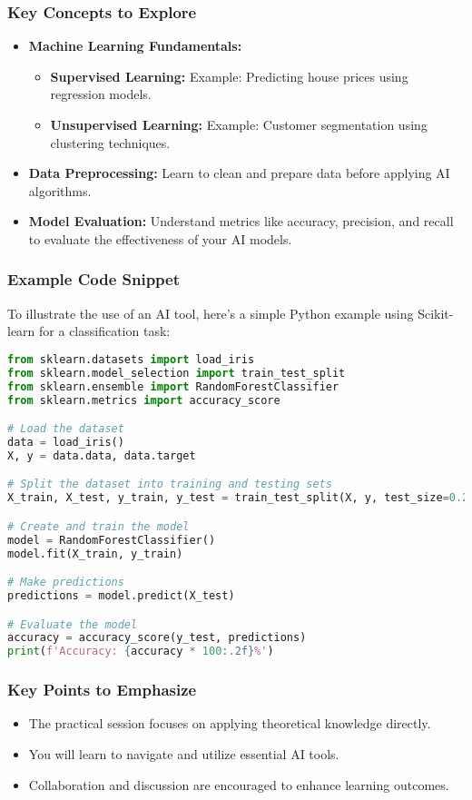 \documentclass{beamer}
\begin{document}
\begin{frame}[fragile]
    \frametitle{Key Concepts to Explore}
    \begin{itemize}
        \item \textbf{Machine Learning Fundamentals:}
            \begin{itemize}
                \item \textbf{Supervised Learning:} Example: Predicting house prices using regression models.
                \item \textbf{Unsupervised Learning:} Example: Customer segmentation using clustering techniques.
            \end{itemize}
        \item \textbf{Data Preprocessing:} Learn to clean and prepare data before applying AI algorithms.
        \item \textbf{Model Evaluation:} Understand metrics like accuracy, precision, and recall to evaluate the effectiveness of your AI models.
    \end{itemize}
\end{frame}

\begin{frame}[fragile]
    \frametitle{Example Code Snippet}
    To illustrate the use of an AI tool, here’s a simple Python example using Scikit-learn for a classification task:
    \begin{lstlisting}[language=Python]
from sklearn.datasets import load_iris
from sklearn.model_selection import train_test_split
from sklearn.ensemble import RandomForestClassifier
from sklearn.metrics import accuracy_score

# Load the dataset
data = load_iris()
X, y = data.data, data.target

# Split the dataset into training and testing sets
X_train, X_test, y_train, y_test = train_test_split(X, y, test_size=0.2, random_state=42)

# Create and train the model
model = RandomForestClassifier()
model.fit(X_train, y_train)

# Make predictions
predictions = model.predict(X_test)

# Evaluate the model
accuracy = accuracy_score(y_test, predictions)
print(f'Accuracy: {accuracy * 100:.2f}%')
    \end{lstlisting}
\end{frame}

\begin{frame}[fragile]
    \frametitle{Key Points to Emphasize}
    \begin{itemize}
        \item The practical session focuses on applying theoretical knowledge directly.
        \item You will learn to navigate and utilize essential AI tools.
        \item Collaboration and discussion are encouraged to enhance learning outcomes.
    \end{itemize}
\end{frame}
\end{document}
